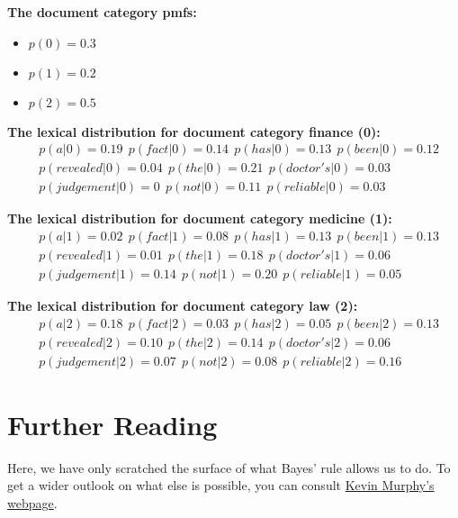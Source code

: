 \textbf{The document category pmfs:}
\begin{itemize}
\item $ p(0) = 0.3 $
\item $ p(1) = 0.2 $
\item $ p(2) = 0.5 $
\end{itemize}

\textbf{The lexical distribution for document category finance (0):}
\begin{align*}
&p(a|0) = 0.19~~p(fact|0)= 0.14~~p(has|0)=0.13~~p(been|0)=0.12 \\
&p(revealed|0)=0.04~~p(the|0)=0.21~~p(doctor's|0)=0.03 \\
&p(judgement|0)=0~~p(not|0)=0.11~~p(reliable|0)=0.03
\end{align*}

\textbf{The lexical distribution for document category medicine (1):}
\begin{align*}
&p(a|1) = 0.02~~p(fact|1)= 0.08~~p(has|1)=0.13~~p(been|1)=0.13 \\
&p(revealed|1)=0.01~~p(the|1)=0.18~~p(doctor's|1)=0.06 \\
&p(judgement|1)=0.14~~p(not|1)=0.20~~p(reliable|1)=0.05
\end{align*}

\textbf{The lexical distribution for document category law (2):}
\begin{align*}
&p(a|2) = 0.18~~p(fact|2)= 0.03~~p(has|2)=0.05~~p(been|2)=0.13 \\
&p(revealed|2)=0.10~~p(the|2)=0.14~~p(doctor's|2)=0.06 \\
&p(judgement|2)=0.07~~p(not|2)=0.08~~p(reliable|2)=0.16
\end{align*}

\section*{Further Reading}
Here, we have only scratched the surface of what Bayes' rule allows us to do. To get a wider outlook on what else is possible,
you can consult \href{http://www.cs.ubc.ca/~murphyk/Bayes/bayesrule.html}{Kevin Murphy's webpage}.

